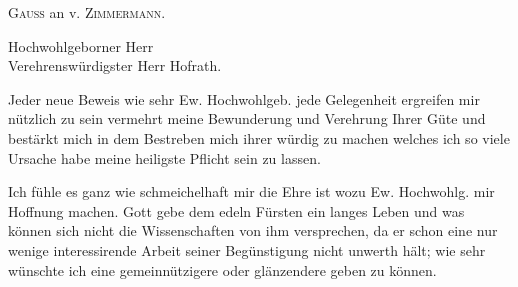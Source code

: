 \NoSourceHead
{}
\begin{center}\large \textsc{Gauss} an v. \textsc{Zimmermann}.\end{center}
\begin{flushleft}\hspace*{.18\linewidth}Hochwohlgeborner Herr\\
\hspace*{.18\linewidth}Verehrenswürdigster Herr Hofrath.\end{flushleft}

Jeder neue Beweis wie sehr Ew. Hochwohlgeb. jede Gelegenheit ergreifen mir nützlich zu sein vermehrt meine Bewunderung und Verehrung Ihrer Güte und bestärkt mich in dem Bestreben mich ihrer würdig zu machen welches ich so viele Ursache habe meine heiligste Pflicht sein zu lassen.

Ich fühle es ganz wie schmeichelhaft mir die Ehre ist wozu Ew. Hochwohlg. mir Hoffnung machen. Gott gebe dem edeln Fürsten ein langes Leben und was können sich nicht die Wissenschaften von ihm versprechen, da er schon eine nur wenige interessirende Arbeit seiner Begünstigung nicht unwerth hält; wie sehr wünschte ich eine gemeinnützigere oder glänzendere geben zu können.

